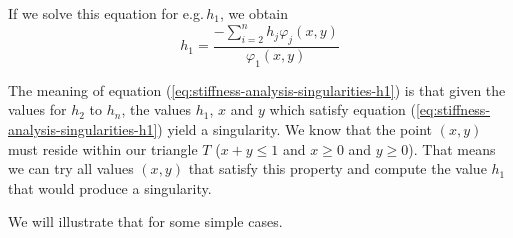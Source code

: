 \documentclass[a4paper, twoside]{article}
\renewcommand{\phi}{\varphi}
\begin{document}
If we solve this equation for e.g.\,$h_1$, we obtain
\begin{equation}
  \label{eq:stiffness-analysis-singularities-h1}
  h_1 = \frac{-\sum_{i=2}^n h_j \phi_j(x,y)}{\phi_1(x,y)}
\end{equation}

The meaning of equation (\ref{eq:stiffness-analysis-singularities-h1}) is that given the values for $h_2$ to $h_n$, the values $h_1$, $x$ and $y$ which satisfy equation (\ref{eq:stiffness-analysis-singularities-h1}) yield a singularity. We know that the point $(x,y)$ must reside within our triangle $T$ ($x+y\leq 1$ and $x\geq 0$ and $y\geq 0$). That means we can try all values $(x,y)$ that satisfy this property and compute the value $h_1$ that would produce a singularity.

We will illustrate that for some simple cases.
\end{document}
